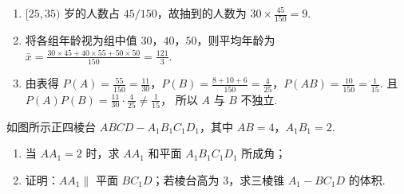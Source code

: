 \begin{solution}
\begin{enumerate}
\item \([25,35)\) 岁的人数占 \(45/150\)，故抽到的人数为 \(30\times \frac{45}{150}=9\).

\item 将各组年龄视为组中值 \(30\)，\(40\)，\(50\)，则平均年龄为
\(\bar x=\frac{30\times45+40\times55+50\times50}{150}=\frac{121}{3}\).

\item 由表得
\(P(A)=\frac{55}{150}=\frac{11}{30}\)，\(P(B)=\frac{8+10+6}{150}=\frac{4}{25}\)，\(P(AB)=\frac{10}{150}=\frac{1}{15}\). 且 \(P(A)P(B)=\frac{11}{30}\cdot\frac{4}{25}\ne \frac{1}{15}\)，
所以 \(A\) 与 \(B\) 不独立.
\end{enumerate}
\end{solution}

\begin{problem}
如图所示正四棱台 \(ABCD-A_1B_1C_1D_1\)，其中 \(AB=4\)，\(A_1B_1=2\).
\begin{enumerate}
\item 当 \(AA_1=2\) 时，求 \(AA_1\) 和平面 \(A_1B_1C_1D_1\) 所成角；
\item 证明：\(AA_1\parallel\) 平面 \(BC_1D\)；若棱台高为 3，求三棱锥 \(A_1-BC_1D\) 的体积.
\end{enumerate}

\end{problem}

